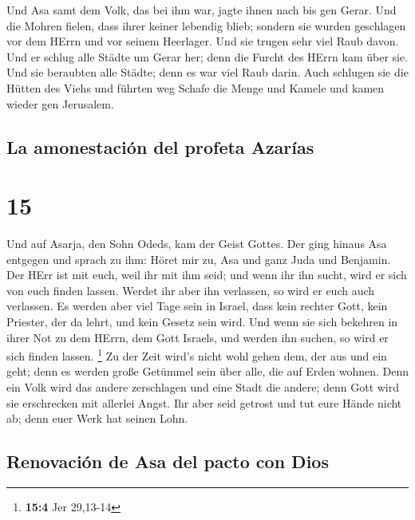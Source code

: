  Und Asa samt dem Volk, das bei ihm war, jagte ihnen nach
bis gen Gerar. Und die Mohren fielen, dass ihrer keiner lebendig blieb;
sondern sie wurden geschlagen vor dem HErrn und vor seinem Heerlager.
Und sie trugen sehr viel Raub davon.  Und er schlug alle
Städte um Gerar her; denn die Furcht des HErrn kam über sie. Und sie
beraubten alle Städte; denn es war viel Raub darin.  Auch
schlugen sie die Hütten des Viehs und führten weg Schafe die Menge und
Kamele und kamen wieder gen Jerusalem.

\hypertarget{la-amonestaciuxf3n-del-profeta-azaruxedas}{%
\subsection{La amonestación del profeta
Azarías}\label{la-amonestaciuxf3n-del-profeta-azaruxedas}}

\hypertarget{section-14}{%
\section{15}\label{section-14}}

 Und auf Asarja, den Sohn Odeds, kam der Geist Gottes.
 Der ging hinaus Asa entgegen und sprach zu ihm: Höret mir
zu, Asa und ganz Juda und Benjamin. Der HErr ist mit euch, weil ihr mit
ihm seid; und wenn ihr ihn sucht, wird er sich von euch finden lassen.
Werdet ihr aber ihn verlassen, so wird er euch auch verlassen.
 Es werden aber viel Tage sein in Israel, dass kein
rechter Gott, kein Priester, der da lehrt, und kein Gesetz sein wird.
 Und wenn sie sich bekehren in ihrer Not zu dem HErrn, dem
Gott Israels, und werden ihn suchen, so wird er sich finden lassen.
\footnote{\textbf{15:4} Jer 29,13-14}  Zu der Zeit wird's
nicht wohl gehen dem, der aus und ein geht; denn es werden große
Getümmel sein über alle, die auf Erden wohnen.  Denn ein
Volk wird das andere zerschlagen und eine Stadt die andere; denn Gott
wird sie erschrecken mit allerlei Angst.  Ihr aber seid
getrost und tut eure Hände nicht ab; denn euer Werk hat seinen Lohn.

\hypertarget{renovaciuxf3n-de-asa-del-pacto-con-dios}{%
\subsection{Renovación de Asa del pacto con
Dios}\label{renovaciuxf3n-de-asa-del-pacto-con-dios}}

